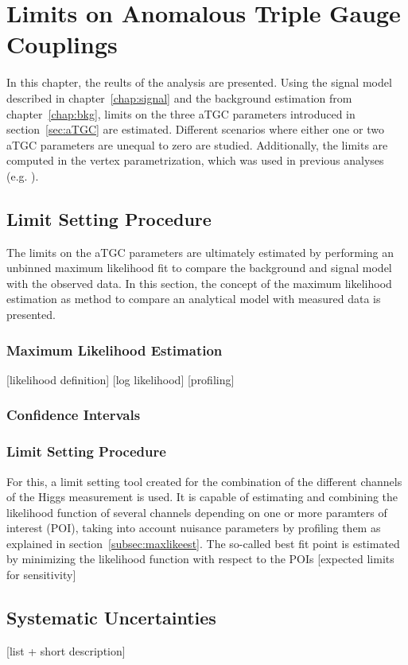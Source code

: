 \chapter{Limits on Anomalous Triple Gauge Couplings}
\label{chap:LimitsonATGCs}


In this chapter, the reults of the analysis are presented. Using the signal model described in chapter~\ref{chap:signal} and the background estimation from chapter~\ref{chap:bkg}, limits on the three aTGC parameters introduced in section~\ref{sec:aTGC} are estimated. Different scenarios where either one or two aTGC parameters are unequal to zero are studied. Additionally, the limits are computed in the vertex parametrization, which was used in previous analyses (e.g. \cite{aTGC1,aTGC2}).


\section{Limit Setting Procedure}
The limits on the aTGC parameters are ultimately estimated by performing an unbinned maximum likelihood fit to compare the background and signal model with the observed data. In this section, the concept of the maximum likelihood estimation as method to compare an analytical model with measured data is presented. 
\subsection{Maximum Likelihood Estimation}
[likelihood definition]
[log likelihood]
[profiling]
\subsection{Confidence Intervals}
\subsection{Limit Setting Procedure}
For this, a limit setting tool \cite{combine} created for the combination of the different channels of the Higgs measurement \cite{higgs_comb} is used. It is capable of estimating and combining the likelihood function of several channels depending on one or more paramters of interest (POI), taking into account nuisance parameters by profiling them as explained in section~\ref{subsec:maxlikeest}. The so-called best fit point is estimated by minimizing the likelihood function with respect to the POIs
[expected limits for sensitivity]

\section{Systematic Uncertainties}
\label{sec:systematics}
[list + short description]
